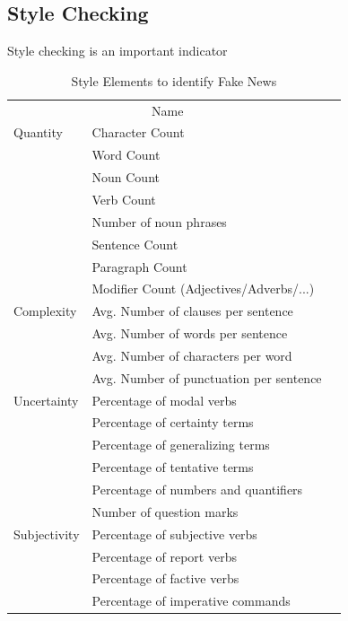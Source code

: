 \documentclass[10pt, a4paper, twocolumn]{article} %
\begin{document}
\subsection{Style Checking}
Style checking is an important indicator
\begin{table}
	\caption{Style Elements to identify Fake News}
	\centering
	\begin{tabular}{llr}
		\toprule
		\multicolumn{2}{c}{Name} \\
		\cmidrule(r){1-2}
		Quantity       & Character Count &  \\
		               & Word Count      &  \\
		               & Noun Count      &  \\
		               & Verb Count      &  \\
		               & Number of noun phrases &  \\
		               & Sentence Count  &  \\
		               & Paragraph Count &  \\
		               & Modifier Count (Adjectives/Adverbs/...) &  \\
		 Complexity    & Avg. Number of clauses per sentence     &  \\
		               & Avg. Number of words per sentence       &  \\
		               & Avg. Number of characters per word      &  \\
		               & Avg. Number of punctuation per sentence &  \\
		 Uncertainty   & Percentage of modal verbs               &  \\
		               & Percentage of certainty terms           &  \\
		               & Percentage of generalizing terms        &  \\
		               & Percentage of tentative terms           &  \\
		               & Percentage of numbers and quantifiers   &  \\
		               & Number of question marks                &  \\
		 Subjectivity  & Percentage of subjective verbs          &  \\
		               & Percentage of report verbs              &  \\
		               & Percentage of factive verbs             &  \\
		               & Percentage of imperative commands       &  \\

\end{tabular}
\end{table}
\end{document}
